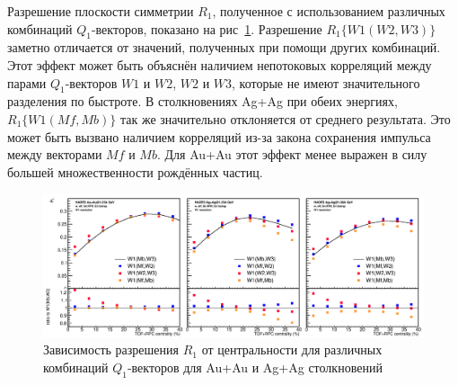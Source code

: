 Разрешение плоскости симметрии $R_1$, полученное с использованием различных комбинаций $Q_1$-векторов, показано на рис~\ref{fig:hades_w1_combinations}.
Разрешение $R_1\{W1(W2,W3)\}$ заметно отличается от значений, полученных при помощи других комбинаций. 
Этот эффект может быть объяснён наличием непотоковых корреляций между парами $Q_1$-векторов $W1$ и $W2$, $W2$ и $W3$, которые не имеют значительного разделения по быстроте. 
В столкновениях Ag+Ag при обеих энергиях, $R_1\{W1(Mf,Mb)\}$ так же значительно отклоняется от среднего результата. 
Это может быть вызвано наличием корреляций из-за закона сохранения импульса между векторами $Mf$ и $Mb$. 
Для Au+Au этот эффект менее выражен в силу большей множественности рождённых частиц.

\begin{figure}[h]
\begin{center}
\includegraphics[width=0.75\linewidth]{images/W1_combinations.png}
\caption{Зависимость  разрешения $R_1$ от центральности для различных комбинаций $Q_1$-векторов
  для Au+Au и  Ag+Ag столкновений}
\label{fig:hades_w1_combinations}
\end{center}
\end{figure}

